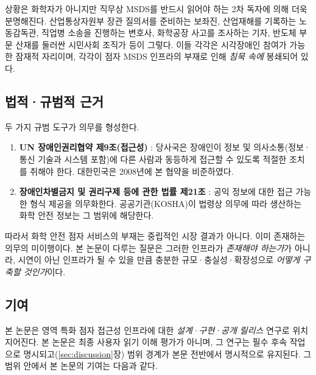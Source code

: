 \documentclass[journal]{IEEEtran}
\begin{document}
상황은 화학자가 아니지만 직무상 MSDS를 반드시 읽어야 하는 2차 독자에 의해 더욱 분명해진다. 산업통상자원부 장관 질의서를 준비하는 보좌진, 산업재해를 기록하는 노동감독관, 직업병 소송을 진행하는 변호사, 화학공장 사고를 조사하는 기자, 반도체 부문 산재를 둘러싼 시민사회 조직가 등이 그렇다. 이들 각각은 시각장애인 참여가 가능한 잠재적 자리이며, 각각이 점자 MSDS 인프라의 부재로 인해 \emph{침묵 속에} 봉쇄되어 있다.

\subsection{법적·규범적 근거}

두 가지 규범 도구가 의무를 형성한다.

\begin{enumerate}
\item \textbf{UN 장애인권리협약 제9조(접근성)} \cite{crpd}: 당사국은 장애인이 정보 및 의사소통(정보·통신 기술과 시스템 포함)에 다른 사람과 동등하게 접근할 수 있도록 적절한 조치를 취해야 한다. 대한민국은 2008년에 본 협약을 비준하였다.

\item \textbf{장애인차별금지 및 권리구제 등에 관한 법률 제21조} \cite{kdpa}: 공익 정보에 대한 접근 가능한 형식 제공을 의무화한다. 공공기관(KOSHA)이 법령상 의무에 따라 생산하는 화학 안전 정보는 그 범위에 해당한다.
\end{enumerate}

따라서 화학 안전 점자 서비스의 부재는 중립적인 시장 결과가 아니다. 이미 존재하는 의무의 미이행이다. 본 논문이 다루는 질문은 그러한 인프라가 \emph{존재해야 하는가}가 아니라, 시연이 아닌 인프라가 될 수 있을 만큼 충분한 규모·충실성·확장성으로 \emph{어떻게 구축할 것인가}이다.

\subsection{기여}

본 논문은 영역 특화 점자 접근성 인프라에 대한 \emph{설계·구현·공개 릴리스} 연구로 위치 지어진다. 본 논문은 최종 사용자 읽기 이해 평가가 아니며, 그 연구는 필수 후속 작업으로 명시되고(\ref{sec:discussion}장) 범위 경계가 본문 전반에서 명시적으로 유지된다. 그 범위 안에서 본 논문의 기여는 다음과 같다.
\end{document}
